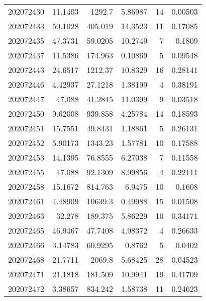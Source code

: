 \begin{tabular}{rrrrrr}
 202072430 &         11.1403  &     1292.7    &            5.86987 &          14 & 0.00503 \\
 202072433 &         50.1028  &      405.019  &           14.3523  &          11 & 0.17085 \\
 202072435 &         47.3731  &       59.0205 &           10.2749  &           7 & 0.1809  \\
 202072437 &         11.5386  &      174.963  &            0.10869 &           5 & 0.09548 \\
 202072443 &         24.6517  &     1212.37   &           10.8329  &          16 & 0.28141 \\
 202072446 &          4.42937 &       27.1218 &            1.38199 &           4 & 0.38191 \\
 202072447 &         47.088   &       41.2845 &           11.0399  &           9 & 0.03518 \\
 202072450 &          9.62008 &      939.858  &            4.25784 &          14 & 0.18593 \\
 202072451 &         15.7551  &       49.8431 &            1.18861 &           5 & 0.26131 \\
 202072452 &          5.90173 &     1343.23   &            1.57781 &          10 & 0.17588 \\
 202072453 &         14.1395  &       76.8555 &            6.27038 &           7 & 0.11558 \\
 202072455 &         47.088   &       92.1309 &            8.99856 &           4 & 0.22111 \\
 202072458 &         15.1672  &      814.763  &            6.9475  &          10 & 0.1608  \\
 202072461 &          4.48909 &    10639.3    &            0.49988 &          15 & 0.01508 \\
 202072463 &         32.278   &      189.375  &            5.86229 &          10 & 0.34171 \\
 202072465 &         46.9467  &       47.7408 &            4.98372 &           4 & 0.26633 \\
 202072466 &          3.14783 &       60.9295 &            0.8762  &           5 & 0.0402  \\
 202072468 &         21.7711  &     2069.8    &            5.68425 &          28 & 0.04523 \\
 202072471 &         21.1818  &      181.509  &           10.9941  &          19 & 0.41709 \\
 202072472 &          3.38657 &      834.242  &            1.58738 &          11 & 0.24623 \\

\end{tabular}
